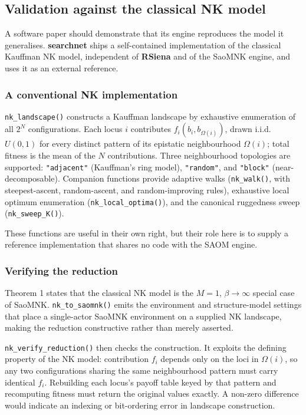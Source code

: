 \documentclass[
]{article}
\begin{document}
\subsection{Validation against the classical NK
model}\label{sec:validation}

A software paper should demonstrate that its engine reproduces the model
it generalises. \textbf{searchnet} ships a self-contained implementation
of the classical Kauffman NK model, independent of \textbf{RSiena} and
of the SaoMNK engine, and uses it as an external reference.

\subsubsection{A conventional NK
implementation}\label{a-conventional-nk-implementation}

\texttt{nk\_landscape()} constructs a Kauffman landscape by exhaustive
enumeration of all \(2^N\) configurations. Each locus \(i\) contributes
\(f_i(b_i,
b_{\Omega(i)})\), drawn i.i.d.~\(U(0,1)\) for every distinct pattern of
its epistatic neighbourhood \(\Omega(i)\); total fitness is the mean of
the \(N\) contributions. Three neighbourhood topologies are supported:
\texttt{"adjacent"} (Kauffman's ring model), \texttt{"random"}, and
\texttt{"block"} (near-decomposable). Companion functions provide
adaptive walks (\texttt{nk\_walk()}, with steepest-ascent,
random-ascent, and random-improving rules), exhaustive local optimum
enumeration (\texttt{nk\_local\_optima()}), and the canonical ruggedness
sweep (\texttt{nk\_sweep\_K()}).

These functions are useful in their own right, but their role here is to
supply a reference implementation that shares no code with the SAOM
engine.

\subsubsection{Verifying the reduction}\label{verifying-the-reduction}

Theorem 1 states that the classical NK model is the \(M = 1\),
\(\beta \rightarrow \infty\) special case of SaoMNK.
\texttt{nk\_to\_saomnk()} emits the environment and structure-model
settings that place a single-actor SaoMNK environment on a supplied NK
landscape, making the reduction constructive rather than merely
asserted.

\texttt{nk\_verify\_reduction()} then checks the construction. It
exploits the defining property of the NK model: contribution \(f_i\)
depends only on the loci in \(\Omega(i)\), so any two configurations
sharing the same neighbourhood pattern must carry identical \(f_i\).
Rebuilding each locus's payoff table keyed by that pattern and
recomputing fitness must return the original values exactly. A non-zero
difference would indicate an indexing or bit-ordering error in landscape
construction.
\end{document}
